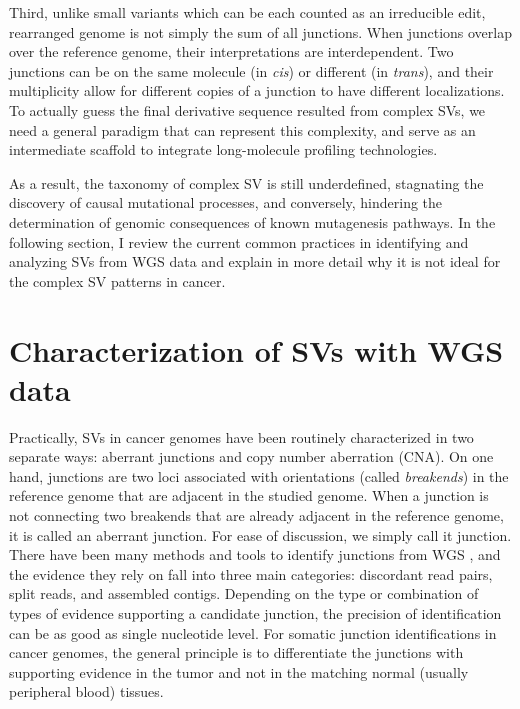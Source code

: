 \documentclass[phd,tocprelim]{cornell}
\begin{document}
Third, unlike small variants which can be each counted as an irreducible edit, rearranged genome is not simply the sum of all junctions. When junctions overlap over the reference genome, their interpretations are interdependent. Two junctions can be on the same molecule (in \textit{cis}) or different (in \textit{trans}), and their multiplicity allow for different copies of a junction to have different localizations. To actually guess the final derivative sequence resulted from complex SVs, we need a general paradigm that can represent this complexity, and serve as an intermediate scaffold to integrate long-molecule profiling technologies.

As a result, the taxonomy of complex SV is still underdefined, stagnating the discovery of causal mutational processes, and conversely, hindering the determination of genomic consequences of known mutagenesis pathways. In the following section, I review the current common practices in identifying and analyzing SVs from WGS data and explain in more detail why it is not ideal for the complex SV patterns in cancer.

\section{Characterization of SVs with WGS data}
Practically, SVs in cancer genomes have been routinely characterized in two separate ways: aberrant junctions and copy number aberration (CNA). On one hand, junctions are two loci associated with orientations (called \textit{breakends}) in the reference genome that are adjacent in the studied genome. When a junction is not connecting two breakends that are already adjacent in the reference genome, it is called an aberrant junction. For ease of discussion, we simply call it junction. There have been many methods and tools to identify junctions from WGS \cite{wala2018,Cameron2017-pz,Rausch2012-ly,Wang2011-lg,Layer2014-xq}, and the evidence they rely on fall into three main categories: discordant read pairs, split reads, and assembled contigs. Depending on the type or combination of types of evidence supporting a candidate junction, the precision of identification can be as good as single nucleotide level. For somatic junction identifications in cancer genomes, the general principle is to differentiate the junctions with supporting evidence in the tumor and not in the matching normal (usually peripheral blood) tissues.
\end{document}
